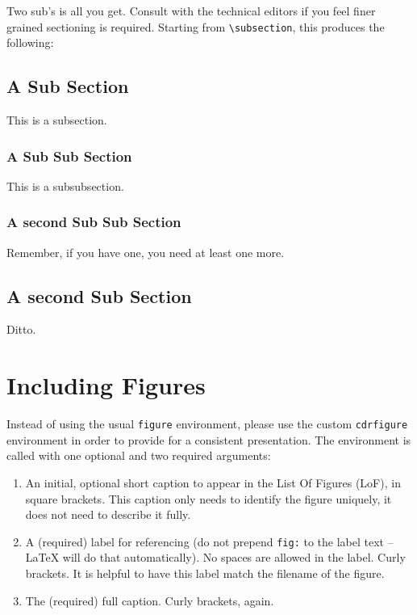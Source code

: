 Two sub's is all you get.  
Consult with the technical editors if you feel finer grained
sectioning is required.
Starting from \verb|\subsection|, this produces the following:

\subsection{A Sub Section}
\label{sec:sub}

This is a subsection.

\subsubsection{A Sub Sub Section}
\label{sec:subsub}

This is a subsubsection.

\subsubsection{A second Sub Sub Section}
\label{sec:subsub2}

Remember, if you have one, you need at least one more.

\subsection{A second Sub Section}
\label{sec:sub}

Ditto.

\section{Including Figures}
\label{sec:figures}

Instead of using the usual \texttt{figure} environment, please use the custom \texttt{cdrfigure}
environment in order to provide for a consistent presentation.
The environment is called with one optional and two required
arguments:

\begin{enumerate}
\item An initial, optional short caption to appear in the List Of Figures (LoF), in square brackets. This caption only needs to
identify the figure uniquely, it does not need to describe it fully.
\item A (required) label for referencing (do not prepend \texttt{fig:} to the label text --  \LaTeX{} will do that automatically). No spaces are allowed in the label. Curly brackets. It is helpful to have this label match the filename of the figure. 
\item The (required) full caption. Curly brackets, again.
\end{enumerate}


